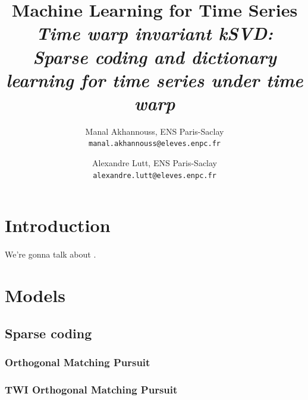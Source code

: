 \documentclass[10pt,twocolumn,letterpaper]{article}
\begin{document}
\title{Machine Learning for Time Series \\ \textit{Time warp invariant kSVD:\\ Sparse coding and dictionary learning for time series under time warp}}

\author{Manal Akhannouss, ENS Paris-Saclay\\
{\tt\small manal.akhannouss@eleves.enpc.fr}
\and
Alexandre Lutt, ENS Paris-Saclay\\
{\tt\small alexandre.lutt@eleves.enpc.fr}
}
\maketitle


\section{Introduction}
\label{sec:intro}

\paragraph{} We're gonna talk about \cite{main_paper}.


\section{Models}
\label{sec:models}

\subsection{Sparse coding}

\subsubsection{Orthogonal Matching Pursuit}

\paragraph{} 

\subsubsection{TWI Orthogonal Matching Pursuit}

\paragraph{} 
\end{document}
